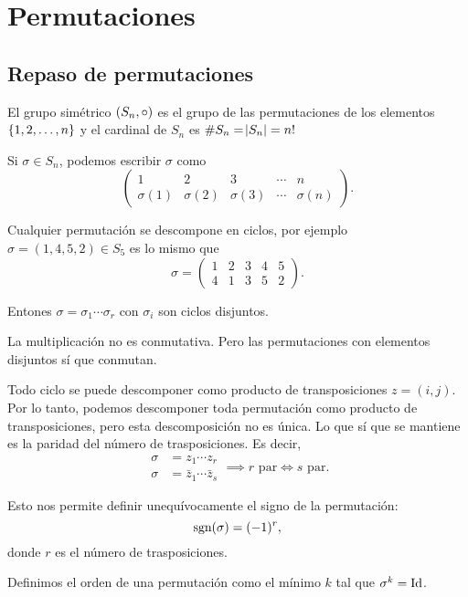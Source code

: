 \chapter{Permutaciones}

\section{Repaso de permutaciones}

El grupo simétrico $\left( S_n, \circ \right)$ es el grupo de las permutaciones de los elementos
$\left\{1, 2, \dots, n\right\}$ y el cardinal de $S_n$ es $\# S_n = \abs{S_n} = n!$

Si $\sigma \in S_n$, podemos escribir $\sigma$ como
\[
    \begin{pmatrix}
        1 & 2 & 3 & \cdots & n \\
        \sigma(1) & \sigma(2) & \sigma(3) & \cdots & \sigma(n)
    \end{pmatrix}.
\]

Cualquier permutación se descompone en ciclos, por ejemplo
$\sigma = (1, 4, 5, 2) \in S_5$ es lo mismo que
\[
    \sigma = 
    \begin{pmatrix}
        1 & 2 & 3 & 4 & 5 \\
        4 & 1 & 3 & 5 & 2
    \end{pmatrix}.
\]

Entones $\sigma = \sigma_1 \cdots \sigma_r$ con $\sigma_i$ son ciclos disjuntos.

\begin{obs}
    La multiplicación no es conmutativa. Pero las permutaciones con elementos disjuntos sí que conmutan.
\end{obs}

Todo ciclo se puede descomponer como producto de transposiciones $z = (i, j)$.
Por lo tanto, podemos descomponer toda permutación como producto de transposiciones, pero esta
descomposición no es única.
Lo que sí que se mantiene es la paridad del número de trasposiciones. Es decir,
\[
    \begin{aligned}
        \sigma &= z_1 \cdots z_r \\
        \sigma &= \bar{z}_1 \cdots \bar{z}_s
    \end{aligned} \implies r \text{ par} \iff s \text{ par}.
\]

Esto nos permite definir unequívocamente el signo de la permutación:
\[
    \text{sgn}(\sigma) = (-1)^{r},
\]
donde $r$ es el número de trasposiciones.

\begin{defi}
    Definimos el orden de una permutación como el mínimo $k$ tal que $\sigma^k = \operatorname{Id}$.
\end{defi}

